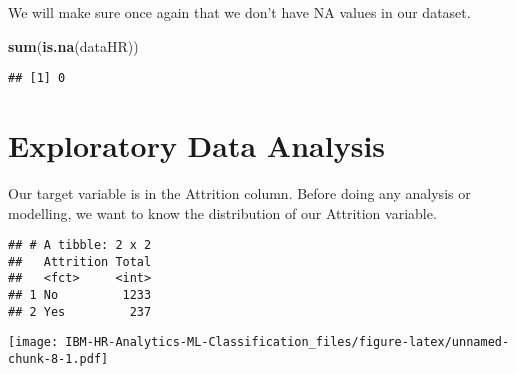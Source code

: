 \documentclass[
]{article}
\newenvironment{Shaded}{\begin{snugshade}}{\end{snugshade}}
\newcommand{\DataTypeTok}[1]{\textcolor[rgb]{0.13,0.29,0.53}{#1}}
\newcommand{\KeywordTok}[1]{\textcolor[rgb]{0.13,0.29,0.53}{\textbf{#1}}}
\newcommand{\NormalTok}[1]{#1}
\newcommand{\OperatorTok}[1]{\textcolor[rgb]{0.81,0.36,0.00}{\textbf{#1}}}
\newcommand{\StringTok}[1]{\textcolor[rgb]{0.31,0.60,0.02}{#1}}
\begin{document}
We will make sure once again that we don't have NA values in our
dataset.

\begin{Shaded}
\begin{Highlighting}[]
\KeywordTok{sum}\NormalTok{(}\KeywordTok{is.na}\NormalTok{(dataHR))}
\end{Highlighting}
\end{Shaded}

\begin{verbatim}
## [1] 0
\end{verbatim}

\hypertarget{exploratory-data-analysis}{%
\section{Exploratory Data Analysis}\label{exploratory-data-analysis}}

Our target variable is in the Attrition column. Before doing any
analysis or modelling, we want to know the distribution of our Attrition
variable.

\begin{Shaded}
\end{Shaded}

\begin{verbatim}
## # A tibble: 2 x 2
##   Attrition Total
##   <fct>     <int>
## 1 No         1233
## 2 Yes         237
\end{verbatim}

\begin{Shaded}
\end{Shaded}

\texttt{[image: IBM-HR-Analytics-ML-Classification\_files/figure-latex/unnamed-chunk-8-1.pdf]}
\end{document}
